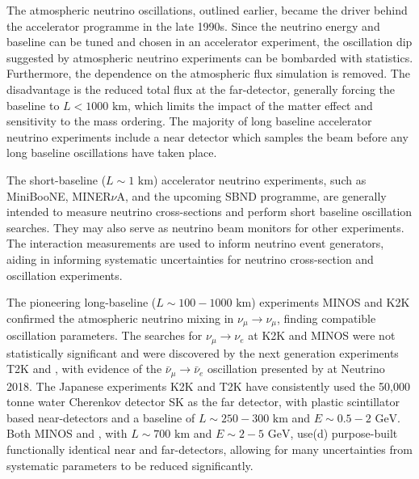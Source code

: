 The atmospheric neutrino oscillations, outlined earlier, became the driver behind the accelerator programme in the late 1990s. Since the neutrino energy and baseline can be tuned and chosen in an accelerator experiment, the oscillation dip suggested by atmospheric neutrino experiments can be bombarded with statistics. Furthermore, the dependence on the atmospheric flux simulation is removed\cite{lbnl_review}. The disadvantage is the reduced total flux at the far-detector, generally forcing the baseline to $L<1000\text{ km}$, which limits the impact of the matter effect and sensitivity to the mass ordering. The majority of long baseline accelerator neutrino experiments include a near detector which samples the beam before any long baseline oscillations have taken place.

The short-baseline ($L\sim 1\text{ km}$) accelerator neutrino experiments, such as MiniBooNE\cite{mb_design}, MINER$\nu$A\cite{minerva_design}, and the upcoming SBND programme\cite{sbnd}, are generally intended to measure neutrino cross-sections and perform short baseline oscillation searches. They may also serve as neutrino beam monitors for other experiments. The interaction measurements are used to inform neutrino event generators\cite{neut,genie,NuWro}, aiding in informing systematic uncertainties for neutrino cross-section and oscillation experiments.

The pioneering long-baseline ($L\sim 100-1000\text{ km}$) experiments MINOS\cite{minos_obs} and K2K\cite{k2k_obs} confirmed the atmospheric neutrino mixing in $\nu_\mu \rightarrow \nu_\mu$, finding compatible oscillation parameters. The searches for $\nu_\mu \rightarrow \nu_e$ at K2K and MINOS were not statistically significant\cite{k2k_noobs,minos_disc} and were discovered by the next generation experiments T2K\cite{t2k_disc} and \nova\cite{nova_disc}, with evidence of the $\bar{\nu}_\mu \rightarrow \bar{\nu}_e$ oscillation presented by \nova at Neutrino 2018\cite{nova_neutrino2018}. The Japanese experiments K2K and T2K have consistently used the 50,000 tonne water Cherenkov detector SK\cite{superk} as the far detector, with plastic scintillator based near-detectors and a baseline of $L\sim250-300\text{ km}$ and $E\sim0.5-2\text{ GeV}$. Both MINOS and \nova, with $L\sim700\text{ km}$ and $E\sim2-5\text{ GeV}$, use(d) purpose-built functionally identical near and far-detectors, allowing for many uncertainties from systematic parameters to be reduced significantly.

